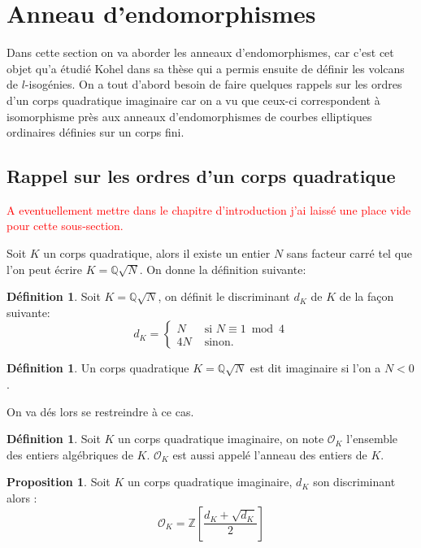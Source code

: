 \documentclass[10pt,a4paper]{book}
\theoremstyle{plain}
\theoremstyle{definition}
\theoremstyle{definition}
\theoremstyle{definition}
\newtheorem{prop}[thm]{Proposition}
\theoremstyle{definition}
\newtheorem{defi}[thm]{Définition}
\theoremstyle{remark}
\theoremstyle{remark}
\theoremstyle{definition}
\begin{document}
\section{Anneau d'endomorphismes}
\label{sec:ann:end}
Dans cette section on va aborder les anneaux d'endomorphismes, car c'est cet objet qu'a étudié Kohel dans sa thèse \cite{Kohel96} qui a permis ensuite de définir les volcans de $l$-isogénies. On a tout d'abord besoin de faire quelques rappels sur les ordres d'un corps quadratique imaginaire car on a vu que ceux-ci correspondent à isomorphisme près aux anneaux d'endomorphismes de courbes elliptiques ordinaires définies sur un corps fini.

\subsection{Rappel sur les ordres d'un corps quadratique}
\textcolor{red}{A eventuellement mettre dans le chapitre d'introduction j'ai laissé une place vide pour cette sous-section.}

Soit $K$ un corps quadratique, alors il existe un entier $N$ sans facteur carré tel que l'on peut écrire $K=\mathbb{Q}\sqrt{N}$. On donne la définition suivante:
\begin{defi}
Soit $K=\mathbb{Q}\sqrt{N}$, on définit le discriminant $d_K$ de $K$ de la façon suivante: 
\begin{equation*}
d_K=\begin{cases}
N & \text{ si }  N \equiv 1 \bmod 4 \\
4N & \text{ sinon.}
\end{cases}
\end{equation*}
\end{defi}

\begin{defi}
Un corps quadratique $K=\mathbb{Q}\sqrt{N}$ est dit imaginaire si l'on a $N<0$. 
\end{defi}

On va dés lors se restreindre à ce cas.

\begin{defi}
Soit $K$ un corps quadratique imaginaire, on note $\mathcal{O}_K$ l'ensemble des entiers algébriques de $K$. $\mathcal{O}_K$ est aussi appelé l'anneau des entiers de $K$.
\end{defi}

\begin{prop}
Soit $K$ un corps quadratique imaginaire, $d_K$ son discriminant alors : 
\[ \mathcal{O}_K=\mathbb{Z} \left[ \frac{d_K+\sqrt{d_K}}{2} \right]  \]  
\end{prop}
\end{document}
